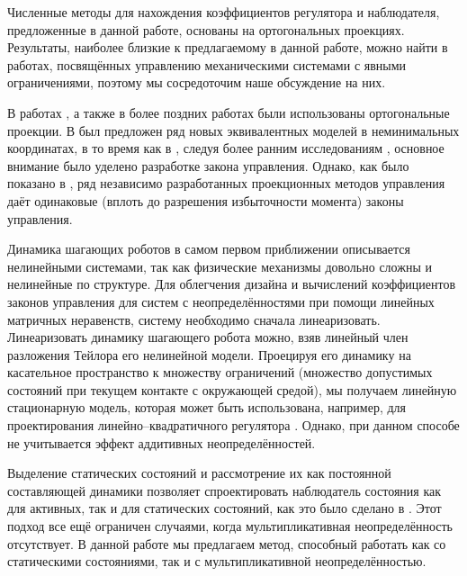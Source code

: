 Численные методы для нахождения коэффициентов регулятора и наблюдателя, предложенные в данной работе, основаны на ортогональных проекциях. Результаты, наиболее близкие к предлагаемому в данной работе, можно найти в работах, посвящённых управлению механическими системами с явными ограничениями, поэтому мы сосредоточим наше обсуждение на них.

В работах \cite{Aghili2003, Aghili2005}, а также в более поздних работах \cite{Righetti2011, Mistry2010, Righetti2013} были использованы ортогональные проекции. В \cite{Aghili2003, Aghili2005} был предложен ряд новых эквивалентных моделей в неминимальных координатах, в то время как в \cite{Mistry2010, Righetti2011, Righetti2013}, следуя более ранним исследованиям \cite{Khatib2007, Sentis2005}, основное внимание было уделено разработке закона управления. Однако, как было показано в \cite{Righetti2011}, ряд независимо разработанных проекционных методов управления даёт одинаковые (вплоть до разрешения избыточности момента) законы управления.

Динамика шагающих роботов в самом первом приближении описывается нелинейными системами, так как физические механизмы довольно сложны и нелинейные по структуре. Для облегчения дизайна и вычислений коэффициентов законов управления для систем с неопределённостями при помощи линейных матричных неравенств, систему необходимо сначала линеаризовать. Линеаризовать динамику шагающего робота можно, взяв линейный член разложения Тейлора его нелинейной модели. Проецируя его динамику на касательное пространство к множеству ограничений (множество допустимых состояний при текущем контакте с окружающей средой), мы получаем линейную стационарную модель, которая может быть использована, например, для проектирования линейно--квадратичного регулятора \cite{mason2014full}. Однако, при данном способе не учитывается эффект аддитивных неопределённостей.

Выделение статических состояний и рассмотрение их как постоянной составляющей динамики позволяет спроектировать наблюдатель состояния как для активных, так и для статических состояний, как это было сделано в \cite{SAVIN2021}. Этот подход все ещё ограничен случаями, когда мультипликативная неопределённость отсутствует. В данной работе мы предлагаем метод, способный работать как со статическими состояниями, так и с мультипликативной неопределённостью.

